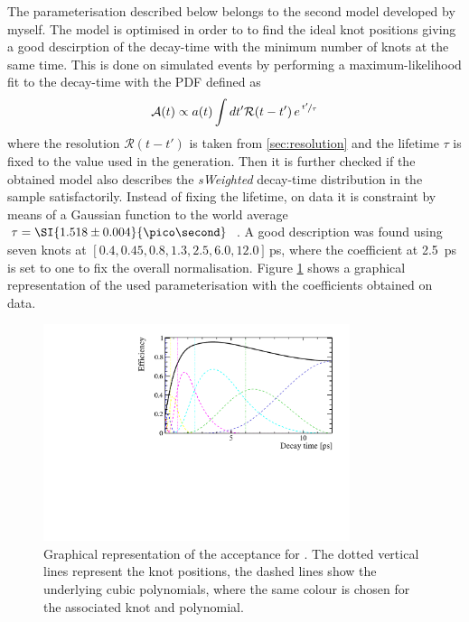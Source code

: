The parameterisation described below belongs to the second model developed by myself.
The model is optimised in order to to find the ideal knot  positions giving a good descirption of the decay-time with the minimum number of knots at the same time.
This is done on simulated events by performing a maximum-likelihood fit to the decay-time with the PDF defined as
\begin{equation}
\mathcal{A}(t)\propto a(t)\int dt' \mathcal{R}\!\left(t-t'\right)e^{\,\nicefrac{t'}{\tau}}
\end{equation}
where the resolution $\mathcal{R}\!\left(t-t'\right)$ is taken from \cref{sec:resolution} and the lifetime $\tau$ is fixed to the value used in the generation.
Then it is further checked if the obtained model also describes the \emph{sWeighted} decay-time distribution in the \BdToDpi sample satisfactorily.
Instead of fixing the lifetime, on data it is constraint by means of a Gaussian function to the world average $\tau=\SI{1.518\pm0.004}{\pico\second}$~\cite{PDG_2017}.
A good description was found using seven knots at $[0.4, 0.45, 0.8, 1.3, 2.5, 6.0, 12.0]\,$\si{\pico\second}, where the coefficient at \SI{2.5}{\pico\second} is set to one to fix the overall normalisation.
Figure \ref{fig:acceptance} shows a graphical representation of the used parameterisation with the coefficients obtained on \BdToDpi data.
\begin{figure}[tbp]
    \centering
    \includegraphics[width=0.8\textwidth]{09TimeFit/figs/Acceptance.pdf}
    \caption{Graphical representation of the acceptance for \BdToDpi.
    The dotted vertical lines represent the knot positions, the dashed lines show the underlying cubic polynomials, where the same colour is chosen for the associated knot and polynomial.}
    \label{fig:acceptance}
\end{figure}

